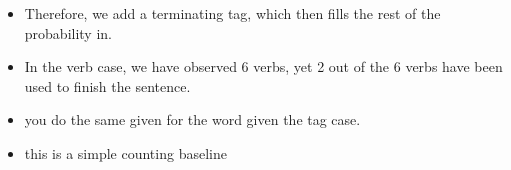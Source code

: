 \documentclass[11pt]{article}
\begin{document}
\begin{minipage}[l]{.5\linewidth}
    \begin{figure}[H]
        \centering
    \end{figure}    
\end{minipage}\hfill
\begin{minipage}[r]{.48\linewidth}
    \begin{itemize}
        \item Therefore, we add a terminating tag, which then fills the rest of the probability in.
        \item In the verb case, we have observed 6 verbs, yet 2 out of the 6 verbs have been used to finish the sentence.
    \end{itemize}
\end{minipage}

\begin{minipage}[l]{.5\linewidth}
    \begin{figure}[H]
        \centering
    \end{figure}    
\end{minipage}\hfill
\begin{minipage}[r]{.48\linewidth}
    \begin{itemize}
        \item you do the same given for the word given the tag case.
        \item this is a simple counting baseline
    \end{itemize}
\end{minipage}
\end{document}
